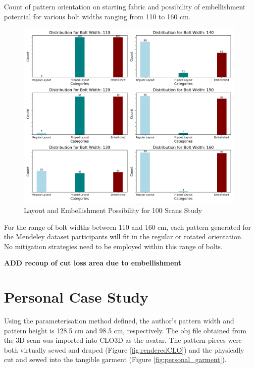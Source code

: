 Count of pattern orientation on starting fabric and possibility of embellishment potential for various bolt widths ranging from 110 to 160 cm.
\begin{figure} [H]
    \centering
    \includegraphics[width = \textwidth]{Images/Mendeley_Bar.png}
    \caption{Layout and Embellishment Possibility for 100 Scans Study}
\end{figure}
For the range of bolt widths between 110 and 160 cm, each pattern generated for the Mendeley dataset participants will fit in the regular or rotated orientation. No mitigation strategies need to be employed within this range of bolts.

\textbf{ADD recoup of cut loss area due to embellishment}

\section{Personal Case Study}
Using the parameterisation method defined, the author's pattern width and pattern height is 128.5 cm and 98.5 cm, respectively. The obj file obtained from the 3D scan was imported into CLO3D as the avatar. The pattern pieces were both virtually sewed and draped (Figure \ref{fig:renderedCLO}) and the physically cut and sewed into the tangible garment (Figure \ref{fig:personal_garment}).

